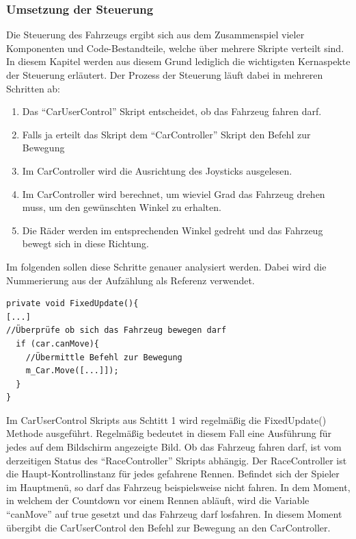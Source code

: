 	\subsubsection{Umsetzung der Steuerung}
	Die Steuerung des Fahrzeugs ergibt sich aus dem Zusammenspiel vieler Komponenten und Code-Bestandteile, welche über mehrere Skripte verteilt sind. In diesem Kapitel werden aus diesem Grund lediglich die wichtigsten Kernaspekte der Steuerung erläutert. Der Prozess der Steuerung läuft dabei in mehreren Schritten ab:
	\begin{enumerate}
		\item{ Das \enquote{CarUserControl} Skript entscheidet, ob das Fahrzeug fahren darf.}
		\item{ Falls ja erteilt das Skript dem \enquote{CarController} Skript den Befehl zur Bewegung}
		\item{ Im CarController wird die Ausrichtung des Joysticks ausgelesen.}
		\item{ Im CarController wird berechnet, um wieviel Grad das Fahrzeug drehen muss, um den gewünschten Winkel zu erhalten.}
		\item{ Die Räder werden im entsprechenden Winkel gedreht und das Fahrzeug bewegt sich in diese Richtung.}
	\end{enumerate}
	Im folgenden sollen diese Schritte genauer analysiert werden. Dabei wird die Nummerierung aus der Aufzählung als Referenz verwendet.
	\begin{lstlisting}
private void FixedUpdate(){
[...]
//Überprüfe ob sich das Fahrzeug bewegen darf
  if (car.canMove){
    //Übermittle Befehl zur Bewegung
    m_Car.Move([...]]);
  }
}
	\end{lstlisting}
	Im CarUserControl Skripts aus Schtitt 1 wird regelmäßig die FixedUpdate() Methode ausgeführt. Regelmäßig bedeutet in diesem Fall eine Ausführung für jedes auf dem Bildschirm angezeigte Bild. Ob das Fahrzeug fahren darf, ist vom derzeitigen Status des \enquote{RaceController} Skripts abhängig. Der RaceController ist die Haupt-Kontrollinstanz für jedes gefahrene Rennen. Befindet sich der Spieler im Hauptmenü, so darf das Fahrzeug beispielsweise nicht fahren. In dem Moment, in welchem der Countdown vor einem Rennen abläuft, wird die Variable \enquote{canMove} auf true gesetzt und das Fahrzeug darf losfahren. In diesem Moment übergibt die CarUserControl den Befehl zur Bewegung an den CarController.

